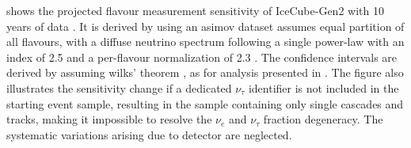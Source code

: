  shows the projected flavour measurement sensitivity of IceCube-Gen2 with 10 years of data . It is derived by using an asimov dataset  assumes equal partition of all flavours, with a diffuse neutrino spectrum following a single power-law with an index of 2.5 and a per-flavour normalization of 2.3 . The confidence intervals are derived by assuming wilks' theorem , as for analysis presented in . The figure also illustrates the sensitivity change if a dedicated $\nu_{\tau}$ identifier is not included in the starting event sample, resulting in the sample containing only single cascades and tracks, making it impossible to resolve the $\nu_e$ and $\nu_{\tau}$ fraction degeneracy. The systematic variations arising due to detector are neglected. 

